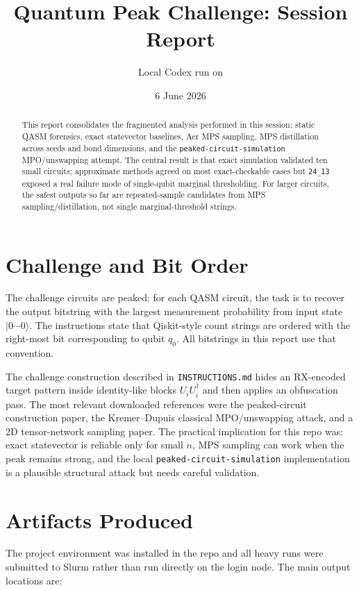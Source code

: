 \documentclass[10pt]{article}
\title{\vspace{-1.2em}Quantum Peak Challenge: Session Report}
\author{Local Codex run on \code{quantum-junction}}
\date{6 June 2026}
\newcommand{\code}[1]{\texttt{#1}}
\begin{document}
\maketitle
\vspace{-1.2em}

\begin{abstract}
This report consolidates the fragmented analysis performed in this session: static QASM forensics, exact statevector baselines, Aer MPS sampling, MPS distillation across seeds and bond dimensions, and the \code{peaked-circuit-simulation} MPO/unswapping attempt.  The central result is that exact simulation validated ten small circuits; approximate methods agreed on most exact-checkable cases but \code{24\_13} exposed a real failure mode of single-qubit marginal thresholding.  For larger circuits, the safest outputs so far are repeated-sample candidates from MPS sampling/distillation, not single marginal-threshold strings.
\end{abstract}

\section{Challenge and Bit Order}
The challenge circuits are peaked: for each QASM circuit, the task is to recover the output bitstring with the largest measurement probability from input state $\lvert 0\cdots 0\rangle$.  The instructions state that Qiskit-style count strings are ordered with the right-most bit corresponding to qubit $q_0$.  All bitstrings in this report use that convention.

The challenge construction described in \code{INSTRUCTIONS.md} hides an RX-encoded target pattern inside identity-like blocks $U_iU_i^\dagger$ and then applies an obfuscation pass.  The most relevant downloaded references were the peaked-circuit construction paper, the Kremer--Dupuis classical MPO/unswapping attack, and a 2D tensor-network sampling paper.  The practical implication for this repo was: exact statevector is reliable only for small $n$, MPS sampling can work when the peak remains strong, and the local \code{peaked-circuit-simulation} implementation is a plausible structural attack but needs careful validation.

\section{Artifacts Produced}
The project environment was installed in the repo and all heavy runs were submitted to Slurm rather than run directly on the login node.  The main output locations are:
\end{document}
